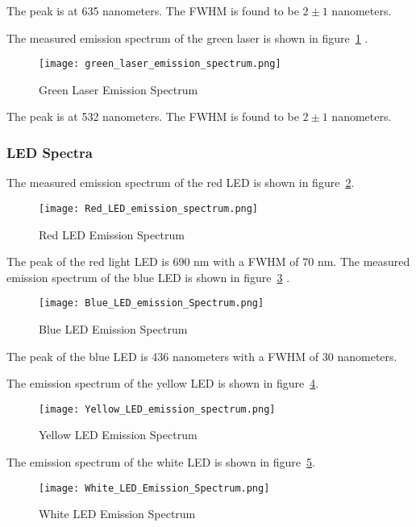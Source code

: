 \documentclass{article}
\begin{document}
The peak is at 635 nanometers. The FWHM is found to be $2 \pm 1$ nanometers. 

The measured emission spectrum of the green laser is shown in figure~\ref{fig: green laser emission} .

\begin{figure}[h!]
    \centering
    \texttt{[image: green\_laser\_emission\_spectrum.png]}
    \caption{Green Laser Emission Spectrum}
    \label{fig: green laser emission}
\end{figure}

The peak is at 532 nanometers. The FWHM is found to be $2 \pm 1$ nanometers. 

\subsubsection{LED Spectra}
The measured emission spectrum of the red LED is shown in figure~\ref{fig:red LED emission}.

\begin{figure}[h!]
    \centering
    \texttt{[image: Red\_LED\_emission\_spectrum.png]}
    \caption{Red LED Emission Spectrum}
    \label{fig:red LED emission}
\end{figure}

The peak of the red light LED is 690 nm with a FWHM of 70 nm.
The measured emission spectrum of the blue LED is shown in figure~\ref{fig:blue LED emission} .

\begin{figure}[h!]
    \centering
    \texttt{[image: Blue\_LED\_emission\_Spectrum.png]}
    \caption{Blue LED Emission Spectrum}
    \label{fig:blue LED emission}
\end{figure}

The peak of the blue LED is 436 nanometers with a FWHM of 30 nanometers.

The emission spectrum of the yellow LED is shown in figure~\ref{fig:yellow LED emission}.

\begin{figure}[h!]
    \centering
    \texttt{[image: Yellow\_LED\_emission\_spectrum.png]}
    \caption{Yellow LED Emission Spectrum}
    \label{fig:yellow LED emission}
\end{figure}

The emission spectrum of the white LED is shown in figure~\ref{fig:white LED emission}.

\begin{figure}[h!]
    \centering
    \texttt{[image: White\_LED\_Emission\_Spectrum.png]}
    \caption{White LED Emission Spectrum}
    \label{fig:white LED emission}
\end{figure}
\end{document}
